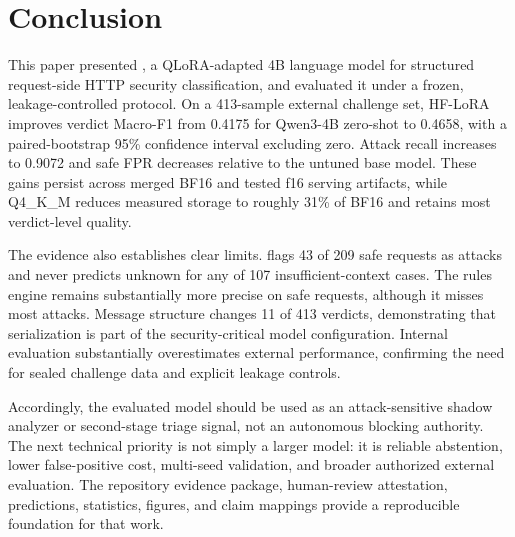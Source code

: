 \section{Conclusion}
\label{sec:conclusion}

This paper presented \model{}, a QLoRA-adapted 4B language model for structured request-side HTTP security classification, and evaluated it under a frozen, leakage-controlled protocol. On a 413-sample external challenge set, HF-LoRA improves verdict Macro-F1 from 0.4175 for Qwen3-4B zero-shot to 0.4658, with a paired-bootstrap 95\% confidence interval excluding zero. Attack recall increases to 0.9072 and safe FPR decreases relative to the untuned base model. These gains persist across merged BF16 and tested f16 serving artifacts, while Q4\_K\_M reduces measured storage to roughly 31\% of BF16 and retains most verdict-level quality.

The evidence also establishes clear limits. \model{} flags 43 of 209 safe requests as attacks and never predicts unknown for any of 107 insufficient-context cases. The rules engine remains substantially more precise on safe requests, although it misses most attacks. Message structure changes 11 of 413 verdicts, demonstrating that serialization is part of the security-critical model configuration. Internal evaluation substantially overestimates external performance, confirming the need for sealed challenge data and explicit leakage controls.

Accordingly, the evaluated model should be used as an attack-sensitive shadow analyzer or second-stage triage signal, not an autonomous blocking authority. The next technical priority is not simply a larger model: it is reliable abstention, lower false-positive cost, multi-seed validation, and broader authorized external evaluation. The repository evidence package, human-review attestation, predictions, statistics, figures, and claim mappings provide a reproducible foundation for that work.
